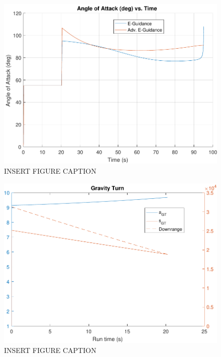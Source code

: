 \begin{figure}[H]
	\centering
	\begin{minipage}{4.5 in}
		\includegraphics[width=\linewidth]{Figures/fatsimvsadv.pdf}
		\caption{INSERT FIGURE CAPTION \label{fig:fatsimvsadv} }
	\end{minipage}
\end{figure}



\begin{figure}[H]
	\centering
	\begin{minipage}{4.5 in}
		\includegraphics[width=\linewidth]{Figures/gtcriterion.pdf}
		\caption{INSERT FIGURE CAPTION \label{fig:gtcriterion} }
	\end{minipage}
\end{figure}



